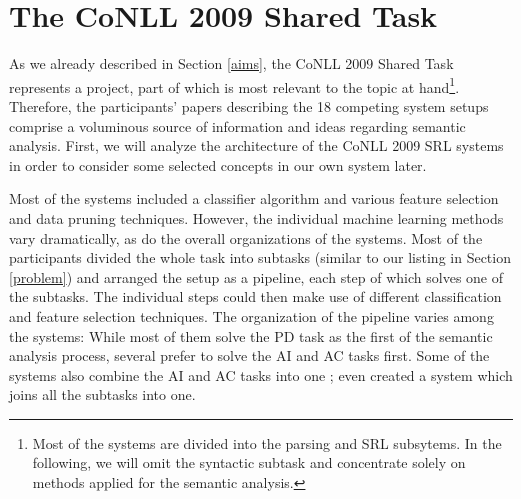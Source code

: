\documentclass[12pt,notitlepage]{report}
\begin{document}
\section{The CoNLL 2009 Shared Task}\label{conll2009}

As we already described in Section \ref{aims}, the CoNLL 2009 Shared Task represents a project, part of which is most relevant to the topic at hand\footnote{Most of the systems are divided into the parsing and SRL subsytems. In the following, we will omit the syntactic subtask and concentrate solely on methods applied for the semantic analysis.}. Therefore, the participants' papers describing the 18 competing system setups comprise a voluminous source of information and ideas regarding semantic analysis. First, we will analyze the architecture of the CoNLL 2009 SRL systems in order to consider some selected concepts in our own system later. 

Most of the systems included a classifier algorithm and various feature selection and data pruning techniques. However, the individual machine learning methods vary dramatically, as do the overall organizations of the systems. Most of the participants divided the whole task into subtasks (similar to our listing in Section \ref{problem}) and arranged the setup as a pipeline, each step of which solves one of the subtasks. The individual steps could then make use of different classification and feature selection techniques. The organization of the pipeline varies among the systems: While most of them solve the PD task as the first of the semantic analysis process, several \citep{bohnet09,zhao09} prefer to solve the AI and AC tasks first. Some of the systems also combine the AI and AC tasks into one \citep{che09,nugues09}; \citet{meza-ruiz09} even created a system which joins all the subtasks into one. 
\end{document}
